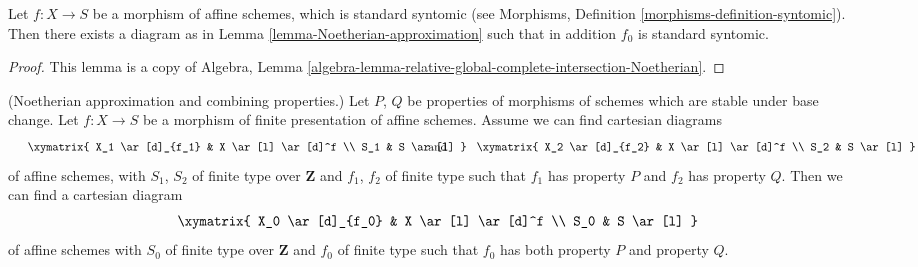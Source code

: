 \begin{lemma}
\label{lemma-Noetherian-approximation-standard-syntomic}
Let $f : X \to S$ be a morphism of affine schemes, which is
standard syntomic (see
Morphisms, Definition \ref{morphisms-definition-syntomic}).
Then there exists a diagram as in
Lemma \ref{lemma-Noetherian-approximation}
such that in addition $f_0$ is standard syntomic.
\end{lemma}

\begin{proof}
This lemma is a copy of
Algebra,
Lemma \ref{algebra-lemma-relative-global-complete-intersection-Noetherian}.
\end{proof}

\begin{lemma}
\label{lemma-Noetherian-approximation-combine}
(Noetherian approximation and combining properties.)
Let $P$, $Q$ be properties of morphisms of schemes which are stable
under base change. Let $f : X \to S$ be a morphism of finite presentation
of affine schemes. Assume we can find cartesian diagrams
$$
\vcenter{
\xymatrix{
X_1 \ar[d]_{f_1} & X \ar[l] \ar[d]^f \\
S_1 & S \ar[l]
}
}
\quad\text{and}\quad
\vcenter{
\xymatrix{
X_2 \ar[d]_{f_2} & X \ar[l] \ar[d]^f \\
S_2 & S \ar[l]
}
}
$$
of affine schemes, with $S_1$, $S_2$ of finite type over $\mathbf{Z}$
and $f_1$, $f_2$ of finite type such that $f_1$ has property $P$
and $f_2$ has property $Q$. Then we can find a cartesian diagram
$$
\xymatrix{
X_0 \ar[d]_{f_0} & X \ar[l] \ar[d]^f \\
S_0 & S \ar[l]
}
$$
of affine schemes with $S_0$ of finite type over $\mathbf{Z}$
and $f_0$ of finite type such that $f_0$ has both property $P$ and
property $Q$.
\end{lemma}

